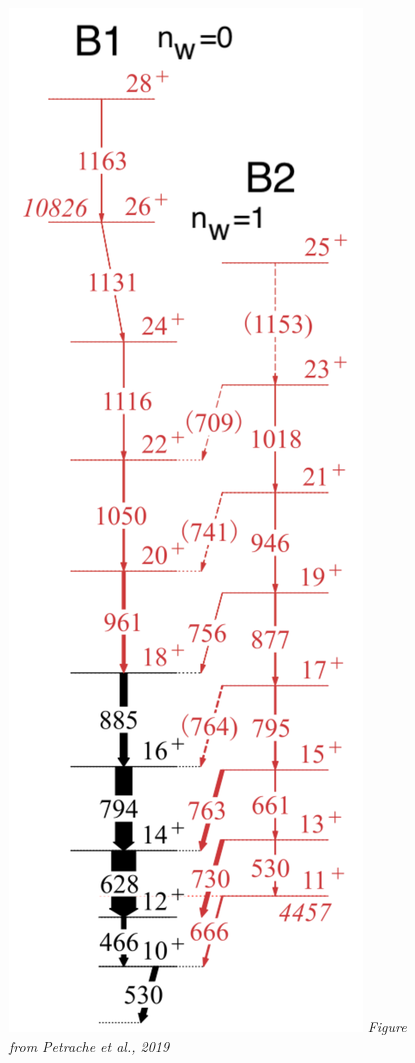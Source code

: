 \documentclass{beamer}
\begin{document}
\begin{frame}
\begin{columns}
\begin{column}{0.2\textwidth}
\begin{figure}
      \includegraphics[scale=0.13]{Figs/ba-130-level-scheme.pdf}
      \tiny{\textit{Figure from Petrache et al., 2019}}
    \end{figure}
  \end{column}
  \end{columns}
\end{frame}
\end{document}
